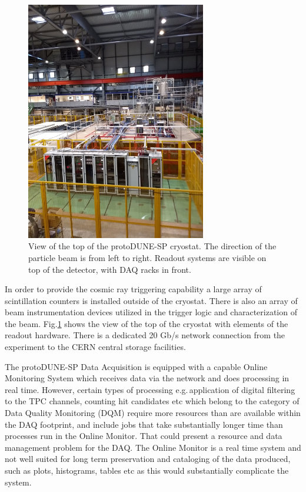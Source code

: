 \documentclass{webofc}
\newcommand{\pd}{protoDUNE\xspace}
\begin{document}
\begin{figure}[tb]
\centering\includegraphics[width=0.7\textwidth]{figures/np04_photo_2018_v1.png}
\caption{\label{fig:np04_photo}View of the top of the \pd-SP cryostat. The direction of the particle beam is from left to right.
Readout systems are visible on top of the detector, with DAQ racks in front.}
\end{figure}


In order to provide the cosmic ray triggering capability a large array of scintillation
counters is installed outside of the cryostat. There is also an array of beam instrumentation devices
utilized in the  trigger logic and characterization of the beam. Fig.\ref{fig:np04_photo}
shows the view of the top of the cryostat with elements of the readout hardware.
There is a dedicated 20 Gb/s network connection from the experiment to the CERN central storage facilities.

The \pd-SP Data Acquisition is equipped with a capable Online Monitoring System which receives data via
the network and does processing in real time. However, certain types of processing e.g.\,application of
digital filtering to the TPC channels, counting hit candidates etc which belong to the
category of Data Quality Monitoring (DQM) require more resources than are available within
the DAQ footprint, and include jobs that take substantially longer time than processes run in the
Online Monitor. That could present a resource and data management problem for the DAQ.
The Online Monitor is a real time system
and not well suited for long term preservation and cataloging of the data produced, such as plots,
histograms, tables etc as this would substantially complicate the system.
\end{document}
